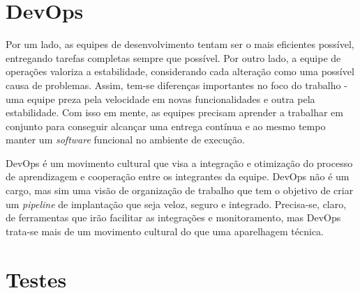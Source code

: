 
\section{DevOps}

Por um lado, as equipes de desenvolvimento tentam ser o mais eficientes possível, entregando tarefas completas sempre que possível. Por outro lado, a equipe de operações valoriza a estabilidade, considerando cada alteração como uma possível causa de problemas. Assim, tem-se diferenças importantes no foco do trabalho - uma equipe preza pela velocidade em novas funcionalidades e outra pela estabilidade. Com isso em mente, as equipes precisam aprender a trabalhar em conjunto para conseguir alcançar uma entrega contínua e ao mesmo tempo manter um \emph{software} funcional no ambiente de execução.

DevOps é um movimento cultural que visa a integração e otimização do processo de aprendizagem e cooperação entre os integrantes da equipe. DevOps não é um cargo, mas sim uma visão de organização de trabalho que tem o objetivo de criar um \emph{pipeline} de implantação que seja veloz, seguro e integrado. Precisa-se, claro, de ferramentas que irão facilitar as integrações e monitoramento, mas DevOps trata-se mais de um movimento cultural do que uma aparelhagem técnica.


\section{Testes}

